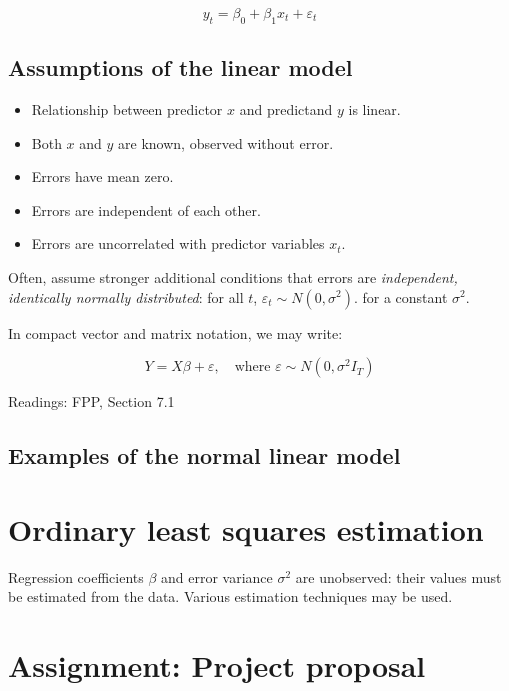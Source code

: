 \documentclass[
]{book}
\begin{document}
\[ y_t = \beta_0 + \beta_1 x_t + \varepsilon_t \]

\hypertarget{assumptions-of-the-linear-model}{%
\section{Assumptions of the linear model}\label{assumptions-of-the-linear-model}}

\begin{itemize}
\item
  Relationship between predictor \(x\) and predictand \(y\) is linear.
\item
  Both \(x\) and \(y\) are known, observed without error.
\item
  Errors have mean zero.
\item
  Errors are independent of each other.\\
\item
  Errors are uncorrelated with predictor variables \(x_t\).
\end{itemize}

Often, assume stronger additional conditions that errors are \emph{independent, identically normally distributed}: for all \(t\), \(\varepsilon_t \sim N(0, \sigma^2)\). for a constant \(\sigma^2\).

In compact vector and matrix notation, we may write:

\[ 
Y = X \beta + \varepsilon,
\quad \text{where $\varepsilon \sim N(0, \sigma^2 I_T)$} 
\]

Readings: FPP, Section 7.1

\hypertarget{examples-of-the-normal-linear-model}{%
\section{Examples of the normal linear model}\label{examples-of-the-normal-linear-model}}

\hypertarget{ordinary-least-squares-estimation}{%
\chapter{Ordinary least squares estimation}\label{ordinary-least-squares-estimation}}

Regression coefficients \(\beta\) and error variance \(\sigma^2\) are unobserved: their values must be estimated from the data. Various estimation techniques may be used.

\hypertarget{assignment-project-proposal}{%
\chapter{Assignment: Project proposal}\label{assignment-project-proposal}}
\end{document}
